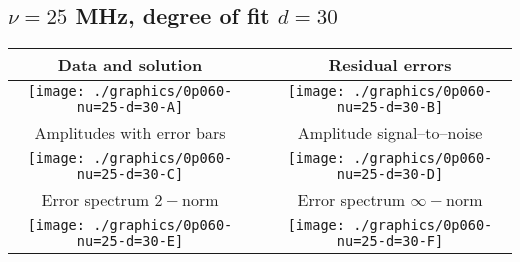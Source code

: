 

% 

\clearpage{}
\break{}

\subsection{$\nu = 25$ MHz, degree of fit $d = 30$}

\begin{table}[h]
    \begin{center}
        \begin{tabular}{ccc}
            Data and solution & \quad & Residual errors \\\hline
            \texttt{[image: ./graphics/0p060-nu=25-d=30-A]} &&
            \texttt{[image: ./graphics/0p060-nu=25-d=30-B]} \\[15pt]
            Amplitudes with error bars && Amplitude signal--to--noise \\\hline
            \texttt{[image: ./graphics/0p060-nu=25-d=30-C]} &&
            \texttt{[image: ./graphics/0p060-nu=25-d=30-D]} \\[15pt]
            Error spectrum $2-$norm && Error spectrum $\infty-$norm \\\hline
            \texttt{[image: ./graphics/0p060-nu=25-d=30-E]} &&
            \texttt{[image: ./graphics/0p060-nu=25-d=30-F]} \\[15pt]
        \end{tabular}
    \end{center}
\label{fig:elev=60, nu=25}
\end{table}



\endinput
